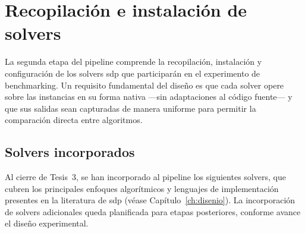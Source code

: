 
\section{Recopilación e instalación de solvers}
\label{sec:avance_solvers}

La segunda etapa del pipeline comprende la recopilación, instalación y configuración
de los solvers \acrshort{sdp} que participarán en el experimento de benchmarking.
Un requisito fundamental del diseño es que cada solver opere sobre las instancias en su
forma nativa —sin adaptaciones al código fuente— y que sus salidas sean capturadas de
manera uniforme para permitir la comparación directa entre algoritmos.

\subsection{Solvers incorporados}
\label{subsec:avance_solvers_seleccionados}

Al cierre de Tesis~3, se han incorporado al pipeline los siguientes solvers, que cubren
los principales enfoques algorítmicos y lenguajes de implementación presentes en la
literatura de \acrshort{sdp} (véase Capítulo~\ref{ch:disenio}).
La incorporación de solvers adicionales queda planificada para etapas posteriores,
conforme avance el diseño experimental.

